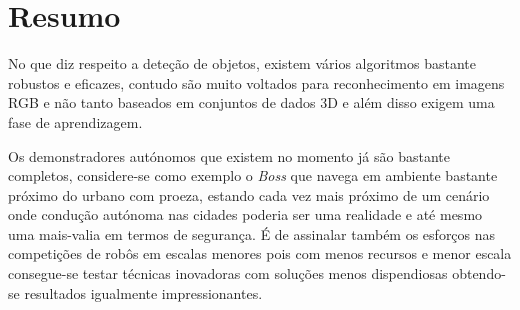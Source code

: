 \section{Resumo}

No que diz respeito a deteção de objetos, existem vários algoritmos bastante robustos e eficazes, contudo são muito voltados para reconhecimento em imagens RGB e não tanto baseados em conjuntos de dados 3D e além disso exigem uma fase de aprendizagem.

Os demonstradores autónomos que existem no momento já são bastante completos, considere-se como exemplo o \emph{Boss} que navega em ambiente bastante próximo do urbano com proeza,
estando cada vez mais próximo de um cenário onde condução autónoma nas cidades poderia ser
uma realidade e até mesmo uma mais-valia em termos de segurança. É de assinalar também os esforços
nas competições de robôs em escalas menores pois com menos recursos e menor escala consegue-se
testar técnicas inovadoras com soluções menos dispendiosas obtendo-se resultados igualmente
impressionantes.

